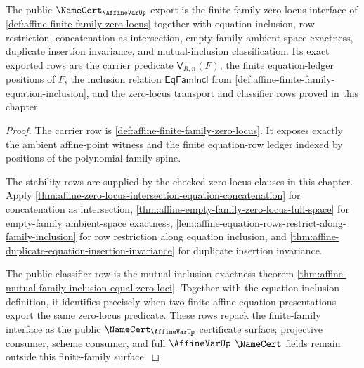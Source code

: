 \begin{theorem}
\label{thm:affinevar-public-zero-locus-namecert}
The public $\NameCert_{\AffineVarUp}$ export is the finite-family zero-locus interface of \autoref{def:affine-finite-family-zero-locus} together with equation inclusion, row restriction, concatenation as intersection, empty-family ambient-space exactness, duplicate insertion invariance, and mutual-inclusion classification. Its exact exported rows are the carrier predicate $\mathsf{V}_{R,n}(F)$, the finite equation-ledger positions of $F$, the inclusion relation $\mathsf{EqFamIncl}$ from \autoref{def:affine-finite-family-equation-inclusion}, and the zero-locus transport and classifier rows proved in this chapter.
\end{theorem}
\begin{proof}
The carrier row is \autoref{def:affine-finite-family-zero-locus}. It exposes exactly the ambient affine-point witness and the finite equation-row ledger indexed by positions of the polynomial-family spine.

The stability rows are supplied by the checked zero-locus clauses in this chapter. Apply \autoref{thm:affine-zero-locus-intersection-equation-concatenation} for concatenation as intersection, \autoref{thm:affine-empty-family-zero-locus-full-space} for empty-family ambient-space exactness, \autoref{lem:affine-equation-rows-restrict-along-family-inclusion} for row restriction along equation inclusion, and \autoref{thm:affine-duplicate-equation-insertion-invariance} for duplicate insertion invariance.

The public classifier row is the mutual-inclusion exactness theorem \autoref{thm:affine-mutual-family-inclusion-equal-zero-loci}. Together with the equation-inclusion definition, it identifies precisely when two finite affine equation presentations export the same zero-locus predicate. These rows repack the finite-family interface as the public $\NameCert_{\AffineVarUp}$ certificate surface; projective consumer, scheme consumer, and full $\AffineVarUp$ $\NameCert$ fields remain outside this finite-family surface.
\end{proof}

